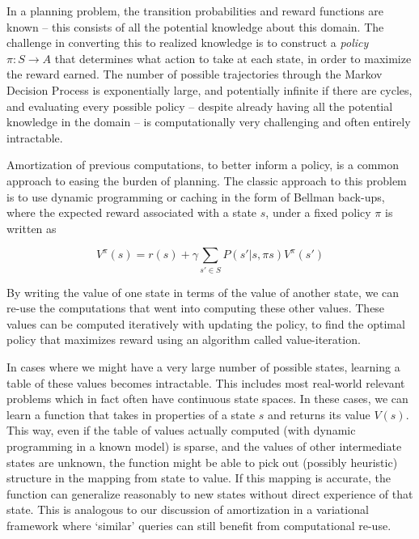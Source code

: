 
In a planning problem, the transition probabilities and reward functions are known -- this consists of all the potential knowledge about this domain. The challenge in converting this to realized knowledge is to construct a \textit{policy} $\pi: S \rightarrow A$ that determines what action to take at each state, in order to maximize the reward earned. The number of possible trajectories through the Markov Decision Process is exponentially large, and potentially infinite if there are cycles, and evaluating every possible policy -- despite already having all the potential knowledge in the domain -- is computationally very challenging and often entirely intractable. 

Amortization of previous computations, to better inform a policy, is a common approach to easing the burden of planning. The classic approach to this problem is to use dynamic programming or caching in the form of Bellman back-ups, where the expected reward associated with a state $s$, under a fixed policy $\pi$ is written as

\begin{equation}
V^{\pi}(s) = r(s) + \gamma \sum_{s' \in S} P(s' | s, \pi{s}) V^{\pi}(s')
\end{equation}

By writing the value of one state in terms of the value of another state, we can re-use the computations that went into computing these other values. These values can be computed iteratively with updating the policy, to find the optimal policy that maximizes reward using an algorithm called value-iteration. 

In cases where we might have a very large number of possible states, learning a table of these values becomes intractable. This includes most real-world relevant problems which in fact often have continuous state spaces. In these cases, we can learn a function that takes in properties of a state $s$ and returns its value $V(s)$. This way, even if the table of values actually computed (with dynamic programming in a known model) is sparse, and the values of other intermediate states are unknown, the function might be able to pick out (possibly heuristic) structure in the mapping from state to value. If this mapping is accurate, the function can generalize reasonably to new states without direct experience of that state. This is analogous to our discussion of amortization in a variational framework where `similar' queries can still benefit from computational re-use.

